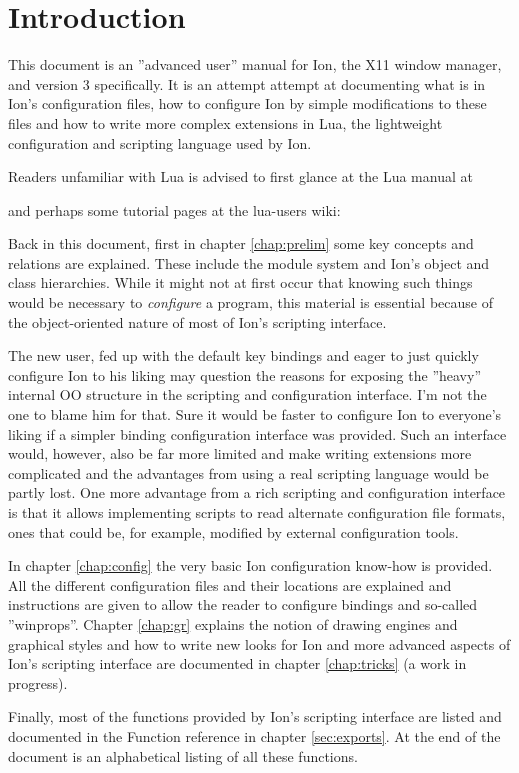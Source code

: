 
\chapter{Introduction}

This document is an ''advanced user'' manual for Ion, the X11 window manager,
and version 3 specifically. It is an attempt attempt at documenting what is 
in Ion's configuration files, how to configure Ion by simple modifications 
to these files and how to write more complex extensions in Lua, the 
lightweight configuration and scripting language used by Ion. 

Readers unfamiliar with Lua is advised to first glance at the Lua manual at 


and perhaps some tutorial pages at the lua-users wiki:


Back in this document, first in chapter \ref{chap:prelim} some key
concepts and relations are explained. These include the module system
and Ion's object and class hierarchies. While it might not at first 
occur that knowing such things would be necessary to \emph{configure} 
a program, this  material is essential because of the object-oriented 
nature of most of Ion's scripting interface.

The new user, fed up with the default key bindings and eager to just
quickly configure Ion to his liking may question the reasons for 
exposing the ''heavy'' internal OO structure in the scripting and
configuration interface. I'm not the one to  blame him for that. 
Sure it would be faster to configure Ion to everyone's liking
if a simpler binding configuration interface was provided. Such an
interface would, however, also be far more limited and make writing
extensions more complicated and the advantages from using a real 
scripting language would be partly lost. One more advantage from
a rich scripting and configuration interface is that it allows 
implementing scripts to read alternate configuration file formats,
ones that could be, for example, modified by external configuration tools. 

In chapter \ref{chap:config} the very basic Ion configuration know-how
is provided. All the different configuration files and their locations
are explained and instructions are given to allow the reader to
configure bindings and so-called ''winprops''. Chapter \ref{chap:gr}
explains the notion of drawing engines and graphical styles and how to
write new looks for Ion and more advanced aspects of Ion's scripting 
interface are documented in chapter \ref{chap:tricks} (a work in 
progress).

Finally, most of the functions provided by Ion's scripting interface
are listed and documented in the Function reference in chapter
\ref{sec:exports}. At the end of the document is an alphabetical
listing of all these functions.


